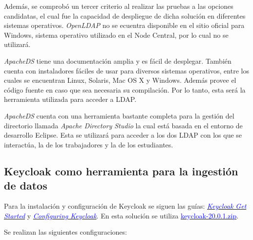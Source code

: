 Además, se comprobó un tercer criterio al realizar las pruebas a las opciones candidatas, el cual fue la capacidad de despliegue de dicha solución en diferentes sistemas operativos. \textit{OpenLDAP} no se ecuentra disponible en el sitio oficial para Windows, sistema operativo utilizado en el Node Central, por lo cual no se utilizará. 

\textit{ApacheDS} tiene una documentación amplia y es fácil de desplegar. También cuenta con instaladores fáciles de usar para diversos sistemas operativos, entre los cuales se encuentran Linux, Solaris, Mac OS X y Windows. Además provee el código fuente en caso que sea necesaria su compilación. Por lo tanto, esta será la herramienta utilizada para acceder a LDAP.

\textit{ApacheDS} cuenta con una herramienta bastante completa para la gestión del directorio llamada \textit{Apache Directory Studio} la cual está basada en el entorno de desarrollo Eclipse. Esta se utilizará para acceder a los dos LDAP con los que se interactúa, la de los trabajadores y la de los estudiantes.

\subsection*{Keycloak como herramienta para la ingestión de datos}
%

Para la instalación y configuración de Keycloak se siguen las guías: \href{https://www.keycloak.org/getting-started/getting-started-zip}{\textcolor{blue}{\textit{Keycloak Get Started}}} y \href{https://www.keycloak.org/server/configuration}{\textit{\textcolor{blue}{Configuring Keycloak}}}. En esta solución se utiliza \href{https://github.com/keycloak/keycloak/releases/download/20.0.1/keycloak-20.0.1.zip}{\textcolor{blue}{keycloak-20.0.1.zip}}.

Se realizan las siguientes configuraciones:


